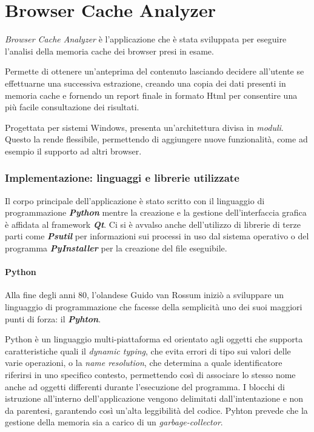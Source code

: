 \chapter{Browser Cache Analyzer}

\textit{Browser Cache Analyzer} è l'applicazione che è stata sviluppata per eseguire l'analisi della memoria cache dei browser presi in esame.

Permette di ottenere un'anteprima del contenuto lasciando decidere all'utente se effettuarne una successiva estrazione, creando una copia dei dati presenti in memoria cache e fornendo un report finale in formato Html per consentire una più facile consultazione dei risultati.

Progettata per sistemi Windows, presenta un'architettura divisa in \textit{moduli}. Questo la rende flessibile, permettendo di aggiungere nuove funzionalità, come ad esempio il supporto ad altri browser.

\subsection{Implementazione: linguaggi e librerie utilizzate}
Il corpo principale dell'applicazione è stato scritto con il linguaggio di programmazione \textbf{\textit{Python}} mentre la creazione e la gestione dell'interfaccia grafica è affidata al framework \textbf{\textit{Qt}}. Ci si è avvalso anche dell'utilizzo di librerie di terze parti come \textbf{\textit{Psutil}} per informazioni sui processi in uso dal sistema operativo o del programma \textbf{\textit{PyInstaller}} per la creazione del file eseguibile.

\clearpage
\subsubsection{Python}
\nocite{Python}
Alla fine degli anni 80, l'olandese Guido van Rossum iniziò a sviluppare un linguaggio di programmazione che facesse della semplicità uno dei suoi maggiori punti di forza: il \textbf{\textit{Pyhton}}. 

Python è un linguaggio multi-piattaforma ed orientato agli oggetti che supporta caratteristiche quali il \textit{dynamic typing}, che evita errori di tipo sui valori delle varie operazioni, o la \textit{name resolution}, che determina a quale identificatore riferirsi in uno specifico contesto, permettendo così di associare lo stesso nome anche ad oggetti differenti durante l'esecuzione del programma. I blocchi di istruzione all'interno dell'applicazione vengono delimitati dall'intentazione e non da parentesi, garantendo così un'alta leggibilità del codice. Pyhton prevede che la gestione della memoria sia a carico di un \textit{garbage-collector}.

